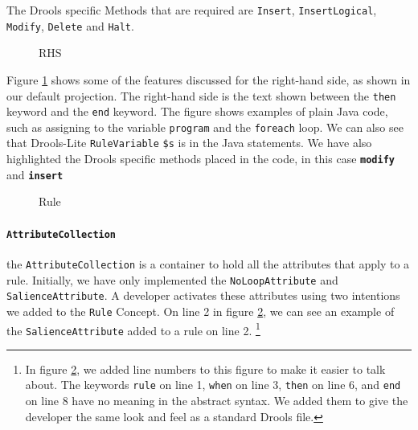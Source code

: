 The Drools specific Methods that are required are \texttt{Insert}, \texttt{InsertLogical}, \texttt{Modify}, \texttt{Delete} and \texttt{Halt}.

\begin{figure}[h]
    \centering
    \caption{RHS}
    \label{fig:RHS}
\end{figure}

Figure \ref{fig:RHS} shows some of the features discussed for the right-hand side, as shown in our default projection.
The right-hand side is the text shown between the \texttt{then} keyword and the \texttt{end} keyword.
The figure shows examples of plain Java code, such as assigning to the variable \texttt{program} and the \texttt{foreach} loop.
We can also see that Drools-Lite \texttt{RuleVariable} \texttt{\$s} is in the Java statements.
We have also highlighted the Drools specific methods placed in the code, in this case \texttt{\textbf{modify}} and \texttt{\textbf{insert}}   

\begin{figure}[h]
    \centering
    \caption{Rule}
    \label{fig:Rule}
\end{figure}

\paragraph{\texttt{AttributeCollection}} the \texttt{AttributeCollection} is a container to hold all the attributes that apply to a rule.
Initially, we have only implemented the \texttt{NoLoopAttribute} and \texttt{SalienceAttribute}.
A developer activates these attributes using two intentions we added to the \texttt{Rule} Concept.
On line 2 in figure \ref{fig:Rule}, we can see an example of the \texttt{SalienceAttribute} added to a rule on line 2.
\footnote{In figure \ref{fig:Rule}, we added line numbers to this figure to make it easier to talk about.
The keywords \texttt{rule} on line 1, \texttt{when} on line 3, \texttt{then} on line 6, and \texttt{end} on line 8 have no meaning in the abstract syntax.
We added them to give the developer the same look and feel as a standard Drools file.}

